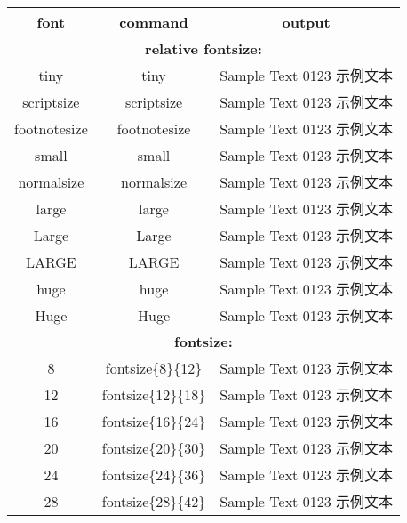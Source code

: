 
\pagestyle{plain}
\fancyhf{}
\thispagestyle{empty}
\begin{center}
\begin{tabular}{|c|c|c|}
\hline
\textbf{font}	&	\textbf{command}		&	\textbf{output}	\\
\hline
\multicolumn{3}{|c|}{\textbf{relative fontsize:}}\\\hline
tiny			&	{\ttfamily {\textbackslash}tiny}			&	{\tiny		Sample Text 0123 示例文本}\\
scriptsize	&	{\ttfamily {\textbackslash}scriptsize}	&	{\scriptsize	Sample Text 0123 示例文本}\\
footnotesize	&	{\ttfamily {\textbackslash}footnotesize}	&	{\footnotesize	Sample Text 0123 示例文本}\\
small		&	{\ttfamily {\textbackslash}small}		&	{\small	Sample Text 0123 示例文本}\\
normalsize	&	{\ttfamily {\textbackslash}normalsize}	&	{\normalsize	Sample Text 0123 示例文本}\\
large		&	{\ttfamily {\textbackslash}large}		&	{\large	Sample Text 0123 示例文本}\\
Large		&	{\ttfamily {\textbackslash}Large}		&	{\Large	Sample Text 0123 示例文本}\\
LARGE		&	{\ttfamily {\textbackslash}LARGE}		&	{\LARGE	Sample Text 0123 示例文本}\\
huge			&	{\ttfamily {\textbackslash}huge}			&	{\huge	Sample Text 0123 示例文本}\\
Huge			&	{\ttfamily {\textbackslash}Huge}			&	{\Huge	Sample Text 0123 示例文本}\\
\hline
\multicolumn{3}{|c|}{\textbf{fontsize:}}\\\hline
8	&	{\ttfamily {\textbackslash}fontsize\{8\}\{12\}}	&	{\fontsize{8}{12}\selectfont	Sample Text 0123 示例文本}\\
12	&	{\ttfamily {\textbackslash}fontsize\{12\}\{18\}}	&	{\fontsize{12}{18}\selectfont	Sample Text 0123 示例文本}\\
16	&	{\ttfamily {\textbackslash}fontsize\{16\}\{24\}}	&	{\fontsize{16}{24}\selectfont	Sample Text 0123 示例文本}\\
20	&	{\ttfamily {\textbackslash}fontsize\{20\}\{30\}}	&	{\fontsize{20}{30}\selectfont	Sample Text 0123 示例文本}\\
24	&	{\ttfamily {\textbackslash}fontsize\{24\}\{36\}}	&	{\fontsize{24}{36}\selectfont	Sample Text 0123 示例文本}\\
28	&	{\ttfamily {\textbackslash}fontsize\{28\}\{42\}}	&	{\fontsize{28}{42}\selectfont	Sample Text 0123 示例文本}\\

\end{tabular}
\end{center}
